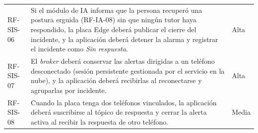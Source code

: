 \documentclass[12pt,a4paper,oneside]{book}
\theoremstyle{plain}
\theoremstyle{definition}
\theoremstyle{remark}
\begin{document}
\begin{table}[H]
\begin{tabular}{L{1.9cm}L{8.2cm}L{1.6cm}}
\addlinespace
RF-SIS-06 & Si el módulo de IA informa que la persona recuperó una postura erguida (RF-IA-08) sin que ningún tutor haya respondido, la placa Edge deberá publicar el cierre del incidente, y la aplicación deberá detener la alarma y registrar el incidente como \textit{Sin respuesta}. & Alta \\
\addlinespace
RF-SIS-07 & El \textit{broker} deberá conservar las alertas dirigidas a un teléfono desconectado (sesión persistente gestionada por el servicio en la nube), y la aplicación deberá recibirlas al reconectarse y agruparlas por incidente. & Alta \\
\addlinespace
RF-SIS-08 & Cuando la placa tenga dos teléfonos vinculados, la aplicación deberá suscribirse al tópico de respuesta y cerrar la alerta activa al recibir la respuesta de otro teléfono. & Media \\
\bottomrule
\end{tabular}
\end{table}
\end{document}
